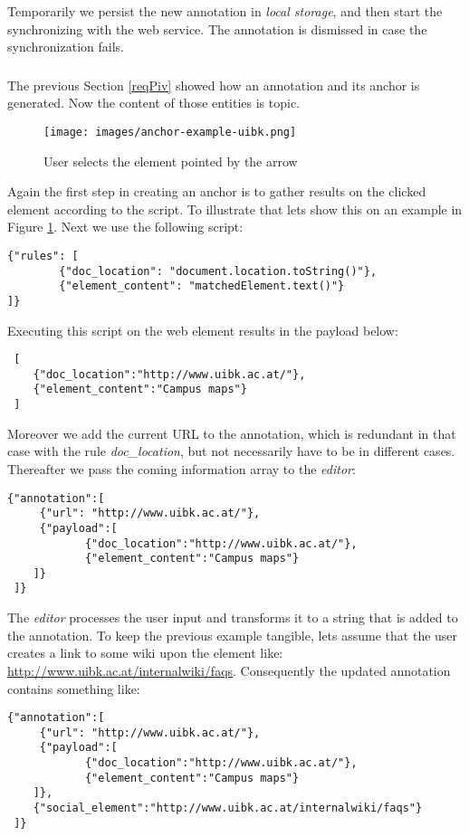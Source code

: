 Temporarily we persist the new annotation in \textit{local storage}, and then start the synchronizing with the web service. The annotation is dismissed in case the synchronization fails. 


\subsubsection[Uniform Sending Format]{\reqPv}\label{reqPv}
The previous Section \ref{reqPiv} showed how an annotation and its anchor is generated. Now the content of those entities is topic. 

\begin{figure}\centering
	\texttt{[image: images/anchor-example-uibk.png]}
\caption{User selects the element pointed by the arrow}
\label{anchor-example-uibk}
\end{figure}


Again the first step in creating an anchor is to gather results on the clicked element according to the script. To illustrate that lets show this on an example in Figure \ref{anchor-example-uibk}. 
Next we use the following script:
\begin{lstlisting}
{"rules": [
        {"doc_location": "document.location.toString()"},
        {"element_content": "matchedElement.text()"}
]}
\end{lstlisting}

Executing this script on the web element results in the payload below:
\begin{lstlisting}
 [
 	{"doc_location":"http://www.uibk.ac.at/"},
 	{"element_content":"Campus maps"}
 ]
\end{lstlisting}

Moreover we add the current URL to the annotation, which is redundant in that case with the rule \textit{doc\_location}, but not necessarily have to be in different cases. Thereafter we pass the coming  information array to the \textit{editor}:
\begin{lstlisting}
{"annotation":[
	 {"url": "http://www.uibk.ac.at/"},
	 {"payload":[
 			{"doc_location":"http://www.uibk.ac.at/"},
 			{"element_content":"Campus maps"}
 	]}
 ]}
\end{lstlisting}

The \textit{editor} processes the user input and transforms it to a string that is added to the annotation. To keep the previous example tangible, lets assume that the user creates a link to some wiki upon the element like: \url{http://www.uibk.ac.at/internalwiki/faqs}. 
Consequently the updated annotation contains something like:
\begin{lstlisting}
{"annotation":[
	 {"url": "http://www.uibk.ac.at/"},
	 {"payload":[
 			{"doc_location":"http://www.uibk.ac.at/"},
 			{"element_content":"Campus maps"}
 	]},
 	{"social_element":"http://www.uibk.ac.at/internalwiki/faqs"}
 ]}
\end{lstlisting}


